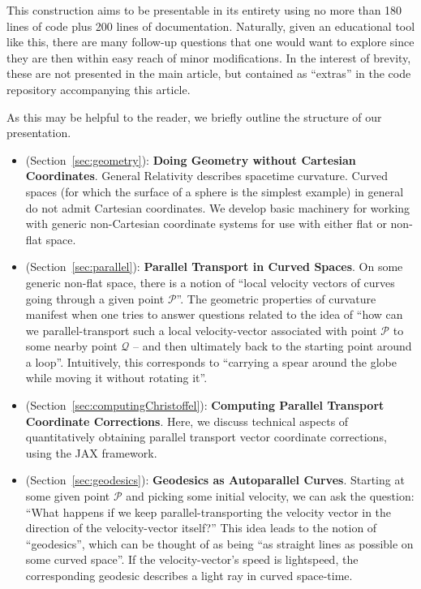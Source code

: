 \documentclass[twocolumn]{article}
\begin{document}
This construction aims to be presentable in its entirety using no more
than 180 lines of code plus 200 lines of documentation. Naturally,
given an educational tool like this, there are many follow-up
questions that one would want to explore since they are then within
easy reach of minor modifications. In the interest of brevity, these
are not presented in the main article, but contained as ``extras'' in
the code repository accompanying this article.

As this may be helpful to the reader, we briefly outline the structure
of our presentation. 

\begin{itemize}

\item (Section~\ref{sec:geometry}): {\bf Doing Geometry without Cartesian Coordinates}.
  General Relativity describes spacetime curvature. Curved spaces
  (for which the surface of a sphere is the simplest example) in general
  do not admit Cartesian coordinates. We develop basic machinery for working
  with generic non-Cartesian coordinate systems for use with either flat or
  non-flat space.

\item (Section~\ref{sec:parallel}): {\bf Parallel Transport in Curved
  Spaces}.  On some generic non-flat space, there is a notion of
  ``local velocity vectors of curves going through a given point
  $\mathcal{P}$''. The geometric properties of curvature manifest when
  one tries to answer questions related to the idea of ``how can we
  parallel-transport such a local velocity-vector associated with
  point $\mathcal{P}$ to some nearby point $\mathcal{Q}$ -- and then
  ultimately back to the starting point around a loop''. Intuitively,
  this corresponds to ``carrying a spear around the globe while moving
  it without rotating it''.

\item (Section~\ref{sec:computingChristoffel}): {\bf Computing
  Parallel Transport Coordinate Corrections}.
  Here, we discuss technical aspects of quantitatively obtaining
  parallel transport vector coordinate corrections, using the JAX
  framework.
  
\item (Section~\ref{sec:geodesics}): {\bf Geodesics as Autoparallel Curves}.
  Starting at some given point ${\mathcal P}$ and picking some initial
  velocity, we can ask the question: ``What happens if we keep
  parallel-transporting the velocity vector in the direction of the
  velocity-vector itself?'' This idea leads to the notion of
  ``geodesics'', which can be thought of as being ``as straight lines
  as possible on some curved space''. If the velocity-vector's speed
  is lightspeed, the corresponding geodesic describes a light ray in
  curved space-time.


\end{itemize}
\end{document}
